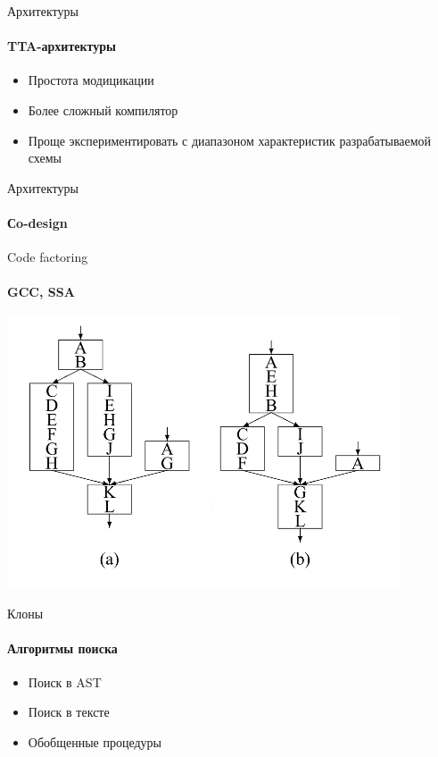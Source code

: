 \documentclass{beamer}              %
\begin{document}
\begin{frame}{Архитектуры}
  \framesubtitle{TTA-архитектуры}
   \begin{itemize}
          \item Простота модицикации
          \item Более сложный компилятор
          \item Проще экспериментировать с диапазоном характеристик разрабатываемой схемы
  	\end{itemize}
  \nocite{Corporaal1994}
\end{frame}

%  

\begin{frame}{Архитектуры}
  \framesubtitle{Сo-design}
  
\end{frame}

\begin{frame}{Code factoring}
  \framesubtitle{GCC, SSA}
  \nocite{Loki2004}
  \includegraphics[height=8cm]{img/CodeFactoring.png}
\end{frame}

  \nocite{Zhao2005}
% 


\begin{frame}{Клоны}
  \framesubtitle{Алгоритмы поиска}
   \begin{itemize}
          \item Поиск в AST
          \item Поиск в тексте
          \item Обобщенные процедуры
  	\end{itemize}
  \nocite{MaFeiTreePatternMatching}
  
\end{frame}
\end{document}

